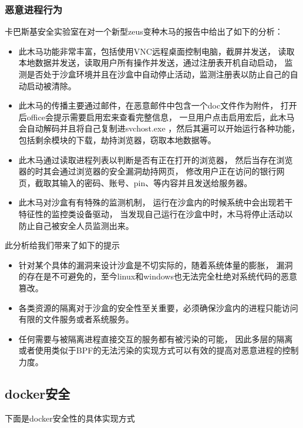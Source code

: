 \documentclass[AutoFakeBold,a4paper]{ctexart}
\begin{document}
\subsubsection{恶意进程行为}

卡巴斯基安全实验室在对一个新型zeus变种木马的报告中给出了如下的分析：\cite{ZeuS2018}

\begin{itemize}
    \item 此木马功能非常丰富，包括使用VNC远程桌面控制电脑，截屏并发送，
    读取本地数据并发送，读取用户所有操作并发送，通过注册表开机自动启动，
    监测是否处于沙盒环境并且在沙盒中自动停止活动，监测注册表以防止自己的自动启动被清除。

    \item 此木马的传播主要通过邮件，在恶意邮件中包含一个doc文件作为附件，
    打开后office会提示需要启用宏来查看完整信息，
    一旦用户点击启用宏后，此木马会自动解码并且将自己复制进svchost.exe
    ，然后其遍可以开始运行各种功能，包括剩余模块的下载，劫持浏览器，窃取本地数据等。
    
    \item 此木马通过读取进程列表以判断是否有正在打开的浏览器，
    然后当存在浏览器的时其会通过浏览器的安全漏洞劫持网页，
    修改用户正在访问的银行网页，截取其输入的密码、账号、pin、等内容并且发送给服务器。
    
    \item 此木马对沙盒有有特殊的监测机制，
    运行在沙盒内的时候系统中会出现若干特征性的监控类设备驱动，
    当发现自己运行在沙盒中时，木马将停止活动以防止自己被安全人员监测出来。
\end{itemize}
此分析给我们带来了如下的提示
\begin{itemize}
    \item 针对某个具体的漏洞来设计沙盒是不切实际的，随着系统体量的膨胀，
    漏洞的存在是不可避免的，至今linux和windows也无法完全杜绝对系统代码的恶意篡改。
    \item 各类资源的隔离对于沙盒的安全性至关重要，必须确保沙盒内的进程只能访问有限的文件服务或者系统服务。
    \item 任何需要与被隔离进程直接交互的服务都有被污染的可能，
    因此多层的隔离或者使用类似于BPF的无法污染的实现方式可以有效的提高对恶意进程的控制力度。
\end{itemize}


\subsection{docker安全}
下面是docker安全性的具体实现方式\cite{boettiger2015introduction} \cite{rad2017introduction}
\end{document}
